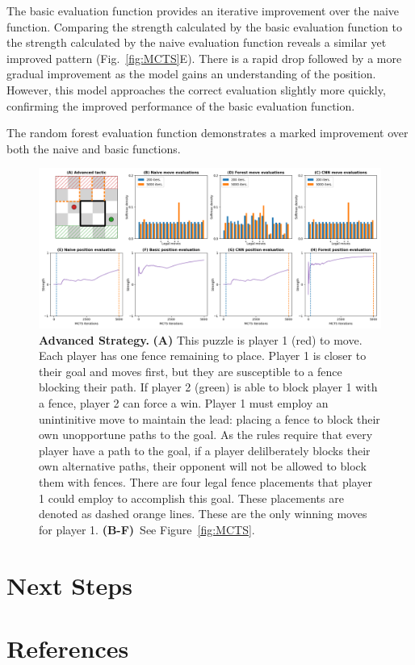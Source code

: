 \documentclass[10pt]{article}
\begin{document}
The basic evaluation function provides an iterative improvement over the naive function. Comparing the strength calculated by the basic evaluation function to the strength calculated by the naive evaluation function reveals a similar yet improved pattern (Fig.~\ref{fig:MCTS}E). There is a rapid drop followed by a more gradual improvement as the model gains an understanding of the position. However, this model approaches the correct evaluation slightly more quickly, confirming the improved performance of the basic evaluation function. 

The random forest evaluation function demonstrates a marked improvement over both the naive and basic functions. 


\begin{figure}[H]
    \centering
    \includegraphics[width=\linewidth]{Adv_tactic.png}
    \caption{\textbf{Advanced Strategy.} \textbf{(A)} This puzzle is player 1 (red) to move. Each player has one fence remaining to place. Player 1 is closer to their goal and moves first, but they are susceptible to a fence blocking their path. If player 2 (green) is able to block player 1 with a fence, player 2 can force a win. Player 1 must employ an unintinitive move to maintain the lead: placing a fence to block their own unopportune paths to the goal. As the rules require that every player have a path to the goal, if a player delilberately blocks their own alternative paths, their opponent will not be allowed to block them with fences. There are four legal fence placements that player 1 could employ to accomplish this goal. These placements are denoted as dashed orange lines. These are the only winning moves for player 1. \textbf{(B-F)}~See Figure~\ref{fig:MCTS}.}
    \label{fig:AdvTactic}
\end{figure}

\section{Next Steps}
\section{References}

% 
% 
\end{document}
